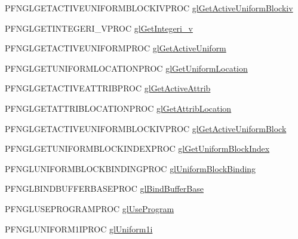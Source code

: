 \begin{DoxyCompactItemize}
\item 
P\+F\+N\+G\+L\+G\+E\+T\+A\+C\+T\+I\+V\+E\+U\+N\+I\+F\+O\+R\+M\+B\+L\+O\+C\+K\+I\+V\+P\+R\+O\+C \hyperlink{class_agmd_1_1_g_l_context_aaa2dbe9daf5030cb3ded28a8a56ae77e}{gl\+Get\+Active\+Uniform\+Blockiv}
\item 
P\+F\+N\+G\+L\+G\+E\+T\+I\+N\+T\+E\+G\+E\+R\+I\+\_\+\+V\+P\+R\+O\+C \hyperlink{class_agmd_1_1_g_l_context_af774dd0ed4bad477a305df7dc56e7e79}{gl\+Get\+Integeri\+\_\+v}
\item 
P\+F\+N\+G\+L\+G\+E\+T\+A\+C\+T\+I\+V\+E\+U\+N\+I\+F\+O\+R\+M\+P\+R\+O\+C \hyperlink{class_agmd_1_1_g_l_context_a18584d3a7027d5467918c643a2708afc}{gl\+Get\+Active\+Uniform}
\item 
P\+F\+N\+G\+L\+G\+E\+T\+U\+N\+I\+F\+O\+R\+M\+L\+O\+C\+A\+T\+I\+O\+N\+P\+R\+O\+C \hyperlink{class_agmd_1_1_g_l_context_a8beb0d36553ab6f99b45edb989da7dcd}{gl\+Get\+Uniform\+Location}
\item 
P\+F\+N\+G\+L\+G\+E\+T\+A\+C\+T\+I\+V\+E\+A\+T\+T\+R\+I\+B\+P\+R\+O\+C \hyperlink{class_agmd_1_1_g_l_context_a6fc9576ab8968dd4d07f4141f4f92627}{gl\+Get\+Active\+Attrib}
\item 
P\+F\+N\+G\+L\+G\+E\+T\+A\+T\+T\+R\+I\+B\+L\+O\+C\+A\+T\+I\+O\+N\+P\+R\+O\+C \hyperlink{class_agmd_1_1_g_l_context_af0344e7f6739cb5e61ed6c7aaa841da6}{gl\+Get\+Attrib\+Location}
\item 
P\+F\+N\+G\+L\+G\+E\+T\+A\+C\+T\+I\+V\+E\+U\+N\+I\+F\+O\+R\+M\+B\+L\+O\+C\+K\+I\+V\+P\+R\+O\+C \hyperlink{class_agmd_1_1_g_l_context_a3111ef3dcd015cca68ca6b0a226d40bf}{gl\+Get\+Active\+Uniform\+Block}
\item 
P\+F\+N\+G\+L\+G\+E\+T\+U\+N\+I\+F\+O\+R\+M\+B\+L\+O\+C\+K\+I\+N\+D\+E\+X\+P\+R\+O\+C \hyperlink{class_agmd_1_1_g_l_context_a7b58f821e60b7fbb9e8d8f9716b2c6dd}{gl\+Get\+Uniform\+Block\+Index}
\item 
P\+F\+N\+G\+L\+U\+N\+I\+F\+O\+R\+M\+B\+L\+O\+C\+K\+B\+I\+N\+D\+I\+N\+G\+P\+R\+O\+C \hyperlink{class_agmd_1_1_g_l_context_a97c3860fa440ef7c1cbfc45714a55abe}{gl\+Uniform\+Block\+Binding}
\item 
P\+F\+N\+G\+L\+B\+I\+N\+D\+B\+U\+F\+F\+E\+R\+B\+A\+S\+E\+P\+R\+O\+C \hyperlink{class_agmd_1_1_g_l_context_a4a64bfb76a6a8b6efe2779f6a62904b2}{gl\+Bind\+Buffer\+Base}
\item 
P\+F\+N\+G\+L\+U\+S\+E\+P\+R\+O\+G\+R\+A\+M\+P\+R\+O\+C \hyperlink{class_agmd_1_1_g_l_context_a7fdb4b3bdd1e0cd02ab944b8860fcf76}{gl\+Use\+Program}
\item 
P\+F\+N\+G\+L\+U\+N\+I\+F\+O\+R\+M1\+I\+P\+R\+O\+C \hyperlink{class_agmd_1_1_g_l_context_a367e6c653c384909450dabecac8087e4}{gl\+Uniform1i}

\end{DoxyCompactItemize}

